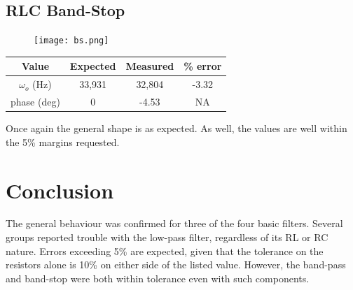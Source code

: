 \documentclass[journal]{IEEEtran}
\begin{document}
\subsection{RLC Band-Stop}

\begin{figure}[H]
\centering
\texttt{[image: bs.png]}
\label{fig_hp}
\end{figure}

\begin{tabular}{|c|c|c|c|}
\hline
Value & Expected & Measured & \% error \\
\hline
$\omega_{o}$ (Hz) & 33,931 & 32,804 & -3.32\\
\hline
phase (deg) & 0 & -4.53 & NA\\
\hline
\end{tabular}

Once again the general shape is as expected. As well, the values are well within the 5\% margins requested.

\section{Conclusion}

The general behaviour was confirmed for three of the four basic filters. Several groups reported trouble with the low-pass filter, regardless of its RL or RC nature. Errors exceeding 5\% are expected, given that the tolerance on the resistors alone is 10\% on either side of the listed value. However, the band-pass and band-stop were both within tolerance even with such components.
\end{document}
